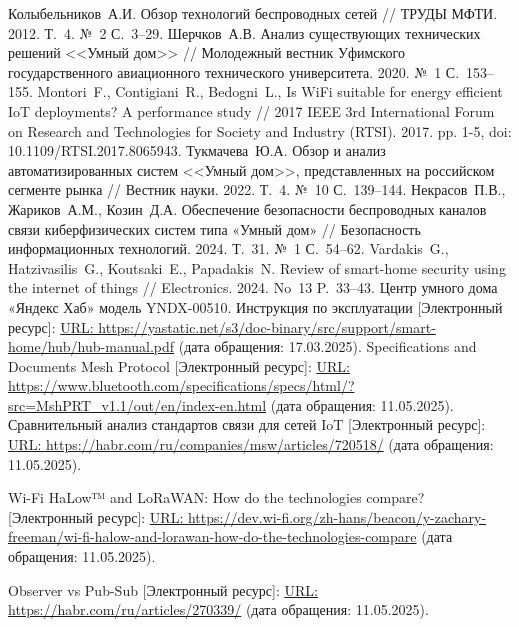 \documentclass[a4paper,12pt]{article}
\begin{document}
\newpage
\begin{thebibliography}{40}
 Колыбельников~А.\:И. Обзор технологий беспроводных сетей // ТРУДЫ МФТИ. 2012. Т.~4. №~2 С.~3--29.
 Шерчков~А.\:В. Анализ существующих технических решений <<Умный дом>> // Молодежный вестник Уфимского государственного авиационного технического университета. 2020. №~1 С.~153--155.
 Montori~F., Contigiani~R., Bedogni~L., Is WiFi suitable for energy efficient IoT deployments? A performance study // 2017 IEEE 3rd International Forum on Research and Technologies for Society and Industry (RTSI). 2017. pp. 1-5, doi: 10.1109/RTSI.2017.8065943.
 Тукмачева~Ю.\:А. Обзор и анализ автоматизированных систем <<Умный дом>>, представленных на российском сегменте рынка // Вестник науки. 2022. Т.~4. №~10 С.~139--144.
 Некрасов~П.\:В., Жариков~А.\:М., Козин~Д.\:А. Обеспечение безопасности беспроводных каналов связи киберфизических систем типа «Умный дом» // Безопасность информационных технологий. 2024. Т.~31. №~1 С.~54--62.
 Vardakis~G., Hatzivasilis~G., Koutsaki~E., Papadakis~N. Review of smart-home security using the internet of things // Electronics. 2024. No~13 P.~33--43.
 Центр умного дома «Яндекс Хаб» модель YNDX-00510. Инструкция по эксплуатации [Электронный ресурс]: \url{URL: https://yastatic.net/s3/doc-binary/src/support/smart-home/hub/hub-manual.pdf} (дата обращения: 17.03.2025).
 Specifications and Documents Mesh Protocol [Электронный ресурс]: \url{URL: https://www.bluetooth.com/specifications/specs/html/?src=MshPRT_v1.1/out/en/index-en.html} (дата обращения: 11.05.2025).
 Сравнительный анализ стандартов связи для сетей IoT [Электронный ресурс]: \url{URL: https://habr.com/ru/companies/msw/articles/720518/} (дата обращения: 11.05.2025).

 Wi-Fi HaLow™ and LoRaWAN: How do the technologies compare? [Электронный ресурс]: \url{URL: https://dev.wi-fi.org/zh-hans/beacon/y-zachary-freeman/wi-fi-halow-and-lorawan-how-do-the-technologies-compare} (дата обращения: 11.05.2025).

 Observer vs Pub-Sub [Электронный ресурс]: \url{URL: https://habr.com/ru/articles/270339/} (дата обращения: 11.05.2025).

\end{thebibliography}
\end{document}
